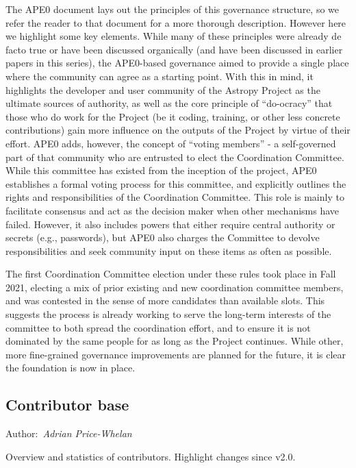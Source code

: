 \documentclass[modern]{aastex631}
\newcommand{\secauthor}[1]{{\color{blue}Author:~\textit{#1}}}
\begin{document}
The APE0 \citep{ape0} document lays out the principles of this governance
structure, so we refer the reader to that document for a more thorough
description.  However here we highlight some key elements. While many of these
principles were already de facto true or have been discussed organically (and
have been discussed in earlier papers in this series), the APE0-based governance
aimed to provide a single place where the community can agree as a starting
point. With this in mind, it highlights the developer and user community of the
Astropy Project as the ultimate sources of authority, as well as the core
principle of ``do-ocracy'' that those who do work for the Project (be it coding,
training, or other less concrete contributions) gain more influence on the
outputs of the Project by virtue of their effort.  APE0 adds, however, the
concept of ``voting members'' - a self-governed part of that community who are
entrusted to elect the Coordination Committee. While this committee has existed
from the inception of the project, APE0 establishes a formal voting process for
this committee, and explicitly outlines the rights and responsibilities of the
Coordination Committee. This role is mainly to facilitate consensus and act as
the decision maker when other mechanisms have failed.  However, it also includes
powers that either require central authority or secrets (e.g., passwords), but
APE0 also charges the Committee to devolve responsibilities and seek community
input on these items as often as possible.

The first Coordination Committee election under these rules took place in Fall
2021, electing a mix of prior existing and new coordination committee members,
and was contested in the sense of more candidates than available slots. This
suggests the process is already working to serve the long-term interests of the
committee to both spread the coordination effort, and to ensure it is not
dominated by the same people for as long as the Project continues. While other,
more fine-grained governance improvements are planned for the future, it is
clear the foundation is now in place.


\subsection{Contributor base} \label{sec:project-contributors}

\secauthor{Adrian Price-Whelan}

Overview and statistics of contributors. Highlight changes since v2.0.
\end{document}
